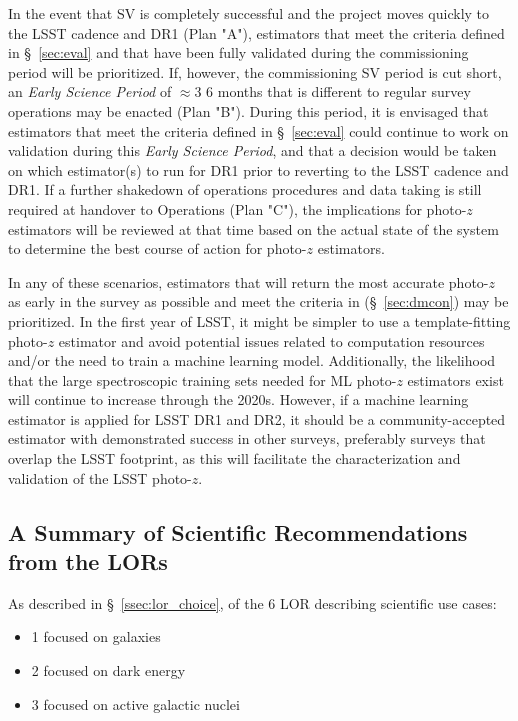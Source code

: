 \documentclass[DM,authoryear,toc]{lsstdoc}
\begin{document}
In the event that SV is completely successful and the project moves quickly to the LSST cadence and DR1 (Plan "A"), estimators that  meet the criteria defined in \S~\ref{sec:eval} and that have been fully validated during the commissioning period will be prioritized. 
If, however, the commissioning SV period is cut short, an {\it Early Science Period} of $\approx$3\,\textendash\,6 months that is different to regular survey operations may be enacted (Plan "B").
During this period, it is envisaged that estimators that meet the criteria defined in \S~\ref{sec:eval} could continue to work on validation during this {\it Early Science Period}, and that a decision would be taken on which estimator(s) to run for DR1 prior to reverting to the LSST cadence and DR1. 
If a further shakedown of operations procedures and data taking is still required at handover to Operations (Plan "C"), the implications for photo-$z$ estimators will be reviewed at that time based on the actual state of the system to determine the best course of action for photo-$z$ estimators. 

In any of these scenarios, estimators that will return the most accurate photo-$z$ as early in the survey as possible and meet the criteria in (\S~\ref{sec:dmcon}) may be prioritized.
In the first year of LSST, it might be simpler to use a template-fitting photo-$z$ estimator and avoid potential issues related to computation resources and/or the need to train a machine learning model.
Additionally, the likelihood that the large spectroscopic training sets needed for ML photo-$z$ estimators exist will continue to increase through the 2020s.
However, if a machine learning estimator is applied for LSST DR1 and DR2, it should be a community-accepted estimator with demonstrated success in other surveys, preferably surveys that overlap the LSST footprint, as this will facilitate the characterization and validation of the LSST photo-$z$.

\subsection{A Summary of Scientific Recommendations from the LORs}\label{ssec:use_scilor}

As described in \S~\ref{ssec:lor_choice}, of the 6 LOR describing scientific use cases:
\begin{itemize}
\item 1 focused on galaxies
\item 2 focused on dark energy
\item 3 focused on active galactic nuclei
\end{itemize}
\end{document}
